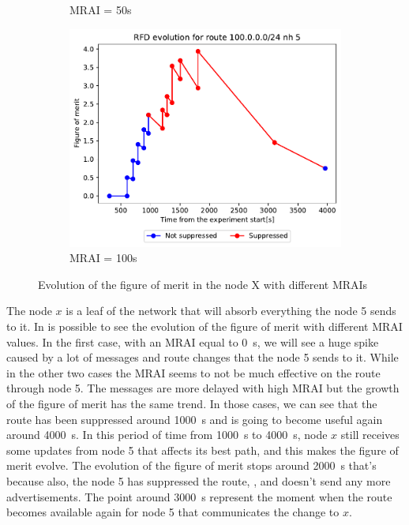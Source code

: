 \begin{figure}[h]
\begin{subfigure}[b]{0.3\textwidth}
         \caption{MRAI = 50s}
         \label{fig:clique_x_mrai50}
     \end{subfigure}
     \hfill
     \begin{subfigure}[b]{0.3\textwidth}
         \centering
         \includegraphics[width=\textwidth]{images/RFD/clique/FigureOfMerit/mrai21_RFD_x_rfd_R1.pdf}
         \caption{MRAI = 100s}
         \label{fig:clique_x_mrai100}
     \end{subfigure}
        \caption{Evolution of the figure of merit in the node X with different MRAIs}
        \label{fig:clique_nodex}
\end{figure}

The node $x$ is a leaf of the network that will absorb everything the node \num{5}
sends to it.
In  is possible to see the evolution of the figure of merit
with different \ac{MRAI} values.
In the first case, with an \ac{MRAI} equal to \SI{0}{\second}, we will see a huge
spike caused by a lot of messages and route changes that the node \num{5} sends
to it.
While in the other two cases 
the \ac{MRAI} seems to not be much effective on the route through node \num{5}.
The messages are more delayed with high \ac{MRAI} but the growth of the figure
of merit has the same trend.
In those cases, we can see that the route has been suppressed around \SI{1000}{\second}
and is going to become useful again around \SI{4000}{\second}.
In this period of time from \SI{1000}{\second} to \SI{4000}{\second}, node $x$ still
receives some updates from node \num{5} that affects its best path, and this
makes the figure of merit evolve.
The evolution of the figure of merit stops around \SI{2000}{\second} that's because
also, the node \num{5} has suppressed the route, , and
doesn't send any more advertisements.
The point around \SI{3000}{\second} represent the moment when the route becomes
available again for node \num{5} that communicates the change to $x$.

